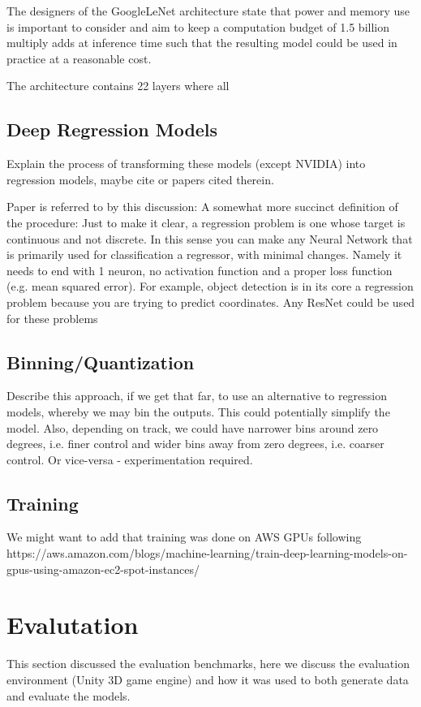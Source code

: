 The designers of the GoogleLeNet architecture state that power and memory use is important to consider and aim to keep a computation budget of 1.5 billion multiply adds at inference time such that the resulting model could be used in practice at a reasonable cost.

The architecture contains 22 layers where all

\subsection{Deep Regression Models}
Explain the process of transforming these models (except NVIDIA) into regression models, maybe cite \cite{lathuilire2018comprehensive} or papers cited therein.

Paper is referred to by this discussion: 
A somewhat more succinct definition of the procedure:  
Just to make it clear, a regression problem is one whose target is continuous and not discrete. In this sense you can make any Neural Network that is primarily used for classification a regressor, with minimal changes. Namely it needs to end with 1 neuron, no activation function and a proper loss function (e.g. mean squared error). For example, object detection is in its core a regression problem because you are trying to predict coordinates. Any ResNet could be used for these problems

\subsection{Binning/Quantization}
Describe this approach, if we get that far, to use an alternative to regression models, whereby we may bin the outputs. This could potentially simplify the model. Also, depending on track, we could have narrower bins around zero degrees, i.e. finer control and wider bins away from zero degrees, i.e. coarser control. Or vice-versa - experimentation required.

\subsection{Training}

We might want to add that training was done on AWS GPUs following   
https://aws.amazon.com/blogs/machine-learning/train-deep-learning-models-on-gpus-using-amazon-ec2-spot-instances/  


\section{Evalutation}
This section discussed the evaluation benchmarks, here we discuss the evaluation environment (Unity 3D game engine) and how it was used to both generate data and evaluate the models.



